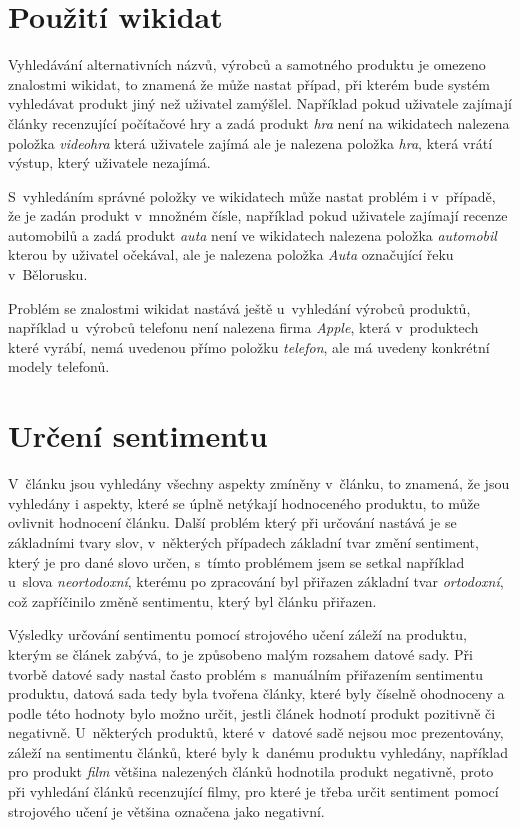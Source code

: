\section{Použití wikidat}
Vyhledávání alternativních názvů, výrobců a samotného produktu je omezeno znalostmi wikidat, to znamená že může nastat případ, při kterém bude systém vyhledávat produkt jiný než uživatel zamýšlel. Například pokud uživatele zajímají články recenzující počítačové hry a zadá produkt \textit{hra} není na wikidatech nalezena položka \textit{videohra} která uživatele zajímá ale je nalezena položka \textit{hra}, která vrátí výstup, který uživatele nezajímá. 

S~vyhledáním správné položky ve wikidatech může nastat problém i v~případě, že je zadán produkt v~množném čísle, například pokud uživatele zajímají recenze automobilů a zadá produkt \textit{auta} není ve wikidatech nalezena položka \textit{automobil} kterou by uživatel očekával, ale je nalezena položka \textit{Auta} označující řeku v~Bělorusku. 

Problém se znalostmi wikidat nastává ještě u~vyhledání výrobců produktů, například u~výrobců telefonu není nalezena firma \textit{Apple}, která v~produktech které vyrábí, nemá uvedenou přímo položku \textit{telefon}, ale má uvedeny konkrétní modely telefonů.

\section{Určení sentimentu}

V~článku jsou vyhledány všechny aspekty zmíněny v~článku, to znamená, že jsou vyhledány i aspekty, které se úplně netýkají hodnoceného produktu, to může ovlivnit hodnocení článku. Další problém který při určování nastává je se základními tvary slov, v~některých případech základní tvar změní sentiment, který je pro dané slovo určen, s~tímto problémem jsem se setkal například u~slova \textit{neortodoxní}, kterému po zpracování byl přiřazen základní tvar \textit{ortodoxní}, což zapříčinilo změně sentimentu, který byl článku přiřazen.  

Výsledky určování sentimentu pomocí strojového učení záleží na produktu, kterým se článek zabývá, to je způsobeno malým rozsahem datové sady. Při tvorbě datové sady nastal často problém s~manuálním přiřazením sentimentu produktu, datová sada tedy byla tvořena články, které byly číselně ohodnoceny a podle této hodnoty bylo možno určit, jestli článek hodnotí produkt pozitivně či negativně. U~některých produktů, které v~datové sadě nejsou moc prezentovány, záleží na sentimentu článků, které byly k~danému produktu vyhledány, například pro produkt \textit{film} většina nalezených článků hodnotila produkt negativně, proto při vyhledání článků recenzující filmy, pro které je třeba určit sentiment pomocí strojového učení je většina označena jako negativní.

